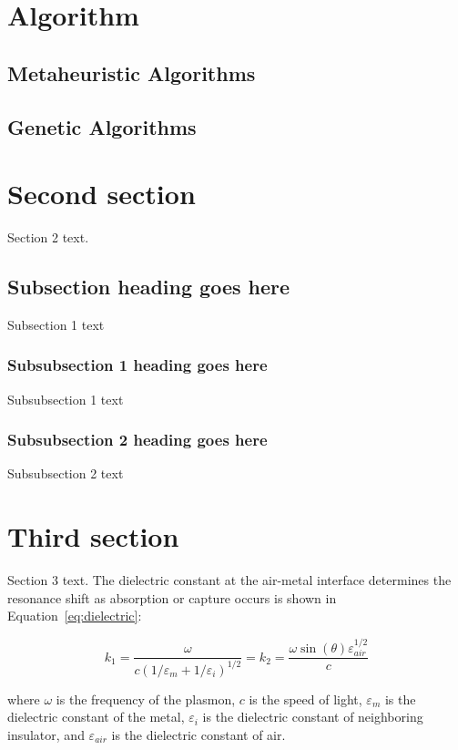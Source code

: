 \section{Algorithm}
\subsection{Metaheuristic Algorithms}
\subsection{Genetic Algorithms}


\section{Second section}
Section 2 text.

\subsection{Subsection heading goes here}

Subsection 1 text

\subsubsection{Subsubsection 1 heading goes here}
Subsubsection 1 text

\subsubsection{Subsubsection 2 heading goes here}
Subsubsection 2 text

\section{Third section}
Section 3 text. The dielectric constant
at the air-metal interface determines
the resonance shift as absorption or capture occurs
is shown in Equation~\eqref{eq:dielectric}:

\begin{equation}\label{eq:dielectric}
k_1=\frac{\omega}{c({1/\varepsilon_m + 1/\varepsilon_i})^{1/2}}=k_2=\frac{\omega
\sin(\theta)\varepsilon_\mathit{air}^{1/2}}{c}
\end{equation}

\noindent
where $\omega$ is the frequency of the plasmon, $c$ is the speed of
light, $\varepsilon_m$ is the dielectric constant of the metal,
$\varepsilon_i$ is the dielectric constant of neighboring insulator,
and $\varepsilon_\mathit{air}$ is the dielectric constant of air.

